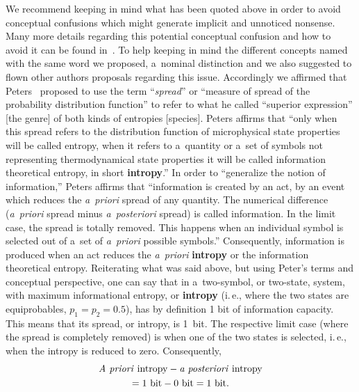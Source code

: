 \begin{multicols}{2}
We recommend keeping in mind what has been quoted above in order to avoid conceptual 
confusions which might generate implicit and unnoticed nonsense. Many more details regarding 
this potential conceptual confusion and how to avoid it can be found in~\cite{2-sel}.  To help keeping in 
mind the different concepts named with the same word we proposed, a~nominal distinction and 
we also suggested to flown other authors proposals regarding this issue. Accordingly we 
affirmed that
Peters~\cite{14-sel} proposed to use the term ``\textit{spread}'' or ``measure of spread of the 
probability distribution function'' to refer to what he called ``superior expression'' [the genre] 
of both kinds of entropies [species]. Peters affirms that ``only when this spread refers to the 
distribution function of microphysical state properties will be called entropy, when it refers 
to a~quantity or a~set of symbols not representing thermodynamical state properties it will be 
called information theoretical entropy, in short \textbf{intropy}.'' In order to ``generalize 
the notion of information,'' Peters affirms that 
``information is created by an act, by an event 
which reduces the \textit{a~priori} spread of any quantity. The numerical difference 
(\textit{a~priori} spread 
minus \textit{a~posteriori} spread) is called information. In the limit case, the spread is totally 
removed. 
This happens when an individual symbol is selected out of a~set of \textit{a~priori} 
possible symbols.'' Consequently, information is produced when an act reduces the
\textit{a~priori}
\textbf{intropy} or the information theoretical entropy. Reiterating what was 
said above, but 
using Peter's terms and conceptual perspective, one can say that in a~two-symbol, or  
two-state, system, with  maximum informational entropy, or \textbf{intropy} (i.\,e., where 
the two states are equiprobables, $p_1 = p_2 = 0.5$), has by definition 1 bit of information 
capacity. This means that its spread, or intropy, is 1~bit. The respective limit case (where 
the spread is completely removed) is when one of the two states is selected, i.\,e., when the 
intropy is reduced to zero. Consequently, 
\begin{multline*}
\mbox{\textit{A priori} intropy} - \mbox{\textit{a posteriori} intropy}\\
 = 1~\mbox{bit}- 0~\mbox{bit}  =  1~\mbox{bit}.
\end{multline*}


\end{multicols}
